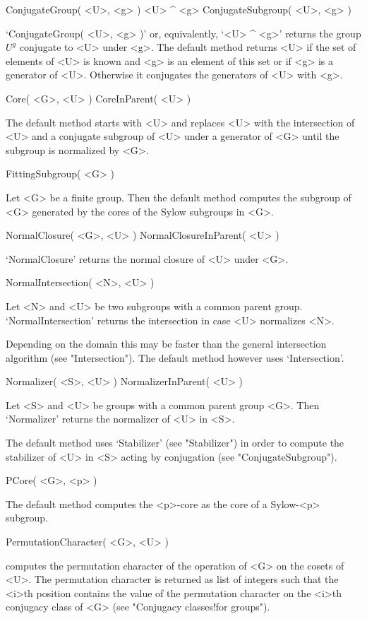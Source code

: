 \>ConjugateGroup( <U>, <g> )
\)<U> ^ <g>
\>ConjugateSubgroup( <U>, <g> )

`ConjugateGroup(  <U>, <g> )' or,  equivalently,  `<U> ^ <g>' returns the
group $U^g$ conjugate to <U> under <g>. The default method returns <U> if
the set of elements of <U> is known and <g> is  an element of this set or
if <g> is a generator  of <U>. Otherwise it  conjugates the generators of
<U> with <g>.

\>Core( <G>, <U> )
\>CoreInParent( <U> )

The default method starts with <U> and replaces <U> with the intersection
of <U> and a conjugate subgroup of <U> under a generator of <G> until the
subgroup is normalized by <G>.

\>FittingSubgroup( <G> )

Let <G> be a finite group. Then the default  method computes the subgroup
of <G> generated by the cores of the Sylow subgroups in <G>.

\>NormalClosure( <G>, <U> )
\>NormalClosureInParent( <U> )

`NormalClosure' returns the normal closure of <U> under <G>.

\>NormalIntersection( <N>, <U> )

Let  <N>  and  <U>  be  two  subgroups   with  a  common   parent  group.
`NormalIntersection' returns the intersection in case <U> normalizes <N>.

Depending on the domain this may be faster  than the general intersection
algorithm    (see  "Intersection").   The  default   method  however uses
`Intersection'.

\>Normalizer( <S>, <U> )
\>NormalizerInParent( <U> )

Let   <S> and <U>  be groups  with  a  common   parent  group  <G>.  Then
`Normalizer' returns the normalizer of <U> in <S>.

The default   method uses  `Stabilizer' (see   "Stabilizer") in  order to
compute  the  stabilizer of <U>   in  <S>   acting  by conjugation   (see
"ConjugateSubgroup").

\>PCore( <G>, <p> )

The  default method computes  the <p>-core  as  the core  of  a Sylow-<p>
subgroup.

\>PermutationCharacter( <G>, <U> )

computes the permutation character of the  operation of <G> on the cosets
of  <U>. The permutation  character is returned  as list of integers such
that the <i>th position  contains the value  of the permutation character
on the <i>th conjugacy class of <G> (see "Conjugacy classes!for groups").

